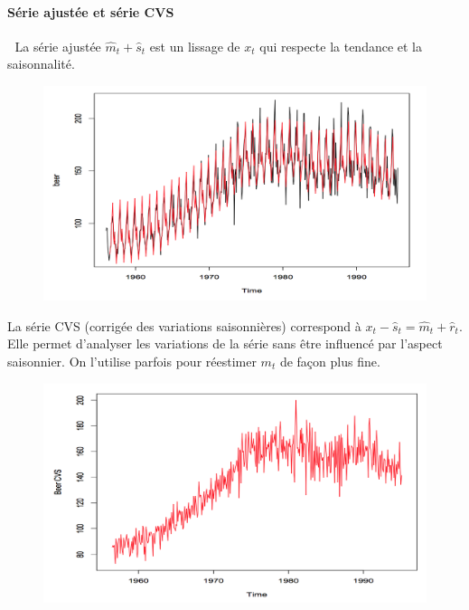 \paragraph{Série ajustée et série CVS}\textcolor{white}{.}\newline
La série ajustée $\hat{m}_{t}+\hat{s}_{t}$ est un lissage de $x_{t}$ qui respecte la tendance et la saisonnalité.
\begin{figure}[H]\begin{center}\includegraphics[scale=0.7]{ilu/ccm41.png}\end{center}\end{figure}
La série CVS (corrigée des variations saisonnières) correspond à $x_{t} - \hat{s}_{t} = \hat{m}_{t} +\hat{r}_{t}$. Elle permet d'analyser les variations de la série sans être influencé par l'aspect saisonnier. On l'utilise parfois pour
réestimer $m_{t}$ de façon plus fine.
\begin{figure}[H]\begin{center}\includegraphics[scale=0.7]{ilu/ccm42.png}\end{center}\end{figure}
